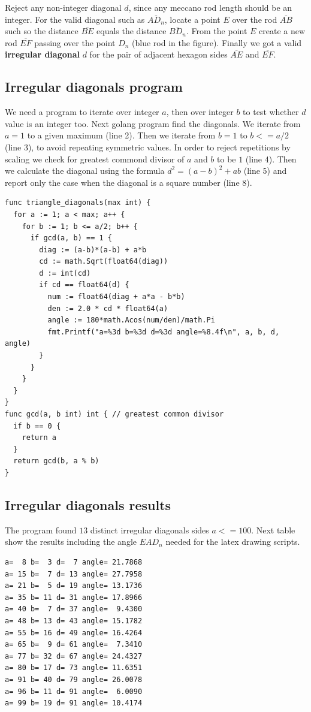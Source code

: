 \documentclass[11pt]{article}
\begin{document}
Reject any non-integer diagonal $d$, since any meccano rod length should be an integer.
For the valid diagonal such as $\overline{AD_n}$, locate a point $E$ over the rod $\overline{AB}$
such so the distance $\overline{BE}$ equals the distance $\overline{BD_n}$.
From the point $E$ create a new rod $\overline{EF}$ passing over the point $D_n$ (blue rod in the figure).
Finally we got a valid \textbf{irregular diagonal} $d$ for the pair of adjacent
hexagon sides $\overline{AE}$ and $\overline{EF}$.

\subsection{Irregular diagonals program}

We need a program to iterate over integer $a$, then over integer $b$ to test whether $d$ value is an integer too.
Next golang program find the diagonals.
We iterate from $a=1$ to a given maximum (line 2).
Then we iterate from $b=1$ to $b <= a/2$ (line 3), to avoid repeating symmetric values.
In order to reject repetitions by scaling we check for greatest commond divisor
of $a$ and $b$ to be $1$ (line 4).
Then we calculate the diagonal using the formula $d^2 = (a-b)^2 + ab$ (line 5) and report
only the case when the diagonal is a square number (line 8). 
\begin{lstlisting}
func triangle_diagonals(max int) {
  for a := 1; a < max; a++ {
    for b := 1; b <= a/2; b++ {
      if gcd(a, b) == 1 {
        diag := (a-b)*(a-b) + a*b
        cd := math.Sqrt(float64(diag))
        d := int(cd)
        if cd == float64(d) {
          num := float64(diag + a*a - b*b)
          den := 2.0 * cd * float64(a)
          angle := 180*math.Acos(num/den)/math.Pi
          fmt.Printf("a=%3d b=%3d d=%3d angle=%8.4f\n", a, b, d, angle)
        }
      }
    }
  }
}
func gcd(a, b int) int { // greatest common divisor
  if b == 0 {
    return a
  }
  return gcd(b, a % b)
}
\end{lstlisting}

\subsection{Irregular diagonals results}
The program found $13$ distinct irregular diagonals sides $a <= 100$.
Next table show the results including the angle $EAD_n$ needed for the latex drawing scripts.
\begin{lstlisting}
a=  8 b=  3 d=  7 angle= 21.7868
a= 15 b=  7 d= 13 angle= 27.7958
a= 21 b=  5 d= 19 angle= 13.1736
a= 35 b= 11 d= 31 angle= 17.8966
a= 40 b=  7 d= 37 angle=  9.4300
a= 48 b= 13 d= 43 angle= 15.1782
a= 55 b= 16 d= 49 angle= 16.4264
a= 65 b=  9 d= 61 angle=  7.3410
a= 77 b= 32 d= 67 angle= 24.4327
a= 80 b= 17 d= 73 angle= 11.6351
a= 91 b= 40 d= 79 angle= 26.0078
a= 96 b= 11 d= 91 angle=  6.0090
a= 99 b= 19 d= 91 angle= 10.4174
\end{lstlisting}
\end{document}
